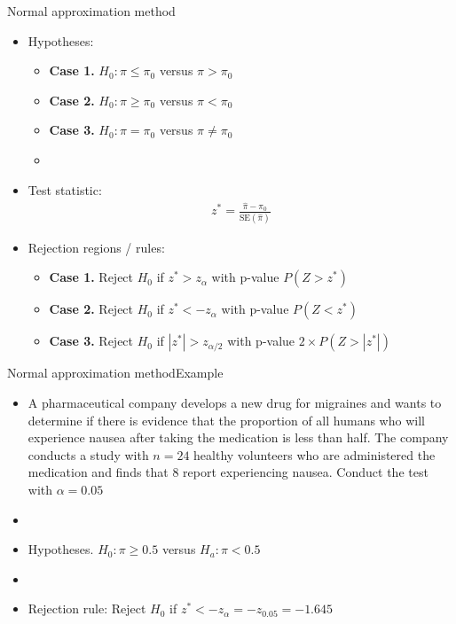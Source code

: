 \documentclass[xcolor=dvipsnames]{beamer}
\begin{document}
\begin{frame}{Normal approximation method}
	\begin{itemize}
		\item Hypotheses: 
		\begin{itemize}
			\item \textbf{Case 1.} $H_0: \pi \leq \pi_0$ versus $\pi > \pi_0$
			\item \textbf{Case 2.} $H_0: \pi \geq \pi_0$ versus $\pi < \pi_0$
			\item \textbf{Case 3.} $H_0: \pi = \pi_0$ versus $\pi \neq \pi_0$
			\item[]
		\end{itemize}
		
		\item Test statistic:
		\begin{gather*}
		z^* = \frac{\hat{\pi}-\pi_0}{\text{SE}(\hat{\pi})}
		\end{gather*}
		
		\item Rejection regions / rules: 
		\begin{itemize}
			\item \textbf{Case 1.} Reject $H_0$ if $z^* > z_{\alpha}$ with p-value $P(Z > z^*)$
			\item \textbf{Case 2.} Reject $H_0$ if $z^* < -z_{\alpha}$ with p-value $P(Z < z^*)$
			\item \textbf{Case 3.} Reject $H_0$ if $|z^*| > z_{\alpha / 2}$ with p-value $2\times P(Z > |z^*|)$
		\end{itemize}
	\end{itemize}
\end{frame}

\begin{frame}{Normal approximation method}{Example}
	\begin{itemize}
		\item A pharmaceutical company develops a new drug for migraines and wants to determine if there is evidence that the proportion of all humans who will experience nausea after taking the medication is less than half. The company conducts a study with $n = 24$ healthy volunteers who are administered the medication and finds that 8 report experiencing nausea. Conduct the test with $\alpha = 0.05$
		\item[]
		\item Hypotheses. $H_0: \pi \geq 0.5$ versus $H_a: \pi < 0.5$
		\item[]
		\item Rejection rule: Reject $H_0$ if $z^* < -z_{\alpha} =  -z_{0.05} = - 1.645$
	\end{itemize}
\end{frame}
\end{document}

